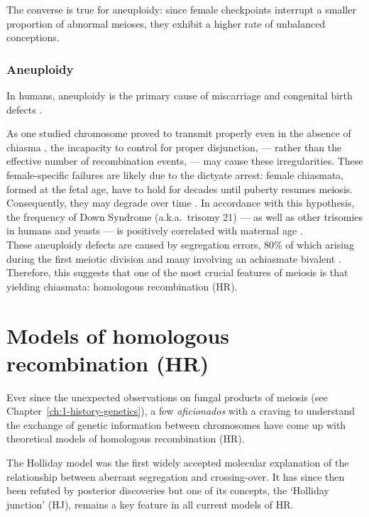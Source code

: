 The converse is true for aneuploidy: since female checkpoints interrupt a smaller proportion of abnormal meioses, they exhibit a higher rate of unbalanced conceptions.



\subsubsection{Aneuploidy}
In humans, aneuploidy is the primary cause of miscarriage and congenital birth defects \citep{hassold2007origin}.

As one studied chromosome proved to transmit properly even in the absence of chiasma \citep{fledel-alon2009broadscale}, the incapacity to control for proper disjunction, — rather than the effective number of recombination events, — may cause these irregularities.
These female-specific failures are likely due to the dictyate arrest: female chiasmata, formed at the fetal age, have to hold for decades until puberty resumes meiosis.
Consequently, they may degrade over time \citep{hassold2001err}.
In accordance with this hypothesis, the frequency of Down Syndrome (a.k.a.\ trisomy 21) — as well as other trisomies in humans \citep{morton1988maternal} and yeasts \citep{boselli2009effects} — is positively correlated with maternal age \citep{penrose2009relative}.\\

These aneuploidy defects are caused by segregation errors, 80\% of which arising during the first meiotic division and many involving an achiasmate bivalent \citep{szekvolgyi2010meiosisa}.
Therefore, this suggests that one of the most crucial features of meiosis is that yielding chiasmata: homologous recombination (HR).










\section{Models of homologous recombination (HR)}

Ever since the unexpected observations on fungal products of meiosis (see Chapter~\ref{ch:1-history-genetics}), a few \textit{aficionados} with a craving to understand the exchange of genetic information between chromosomes have come up with theoretical models of homologous recombination (HR).

The Holliday model \citep{holliday1964mechanism} was the first widely accepted molecular explanation of the relationship between aberrant segregation and crossing-over. 
It has since then been refuted by posterior discoveries but one of its concepts, the ‘Holliday junction’ (HJ), remains a key feature in all current models of HR\@.


